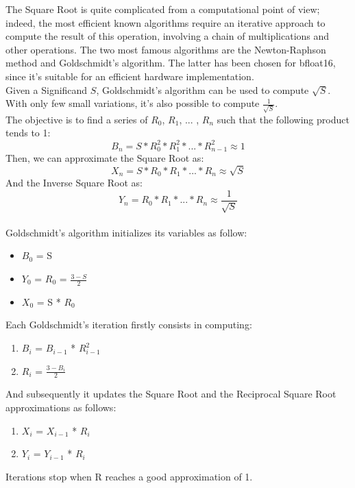 The Square Root is quite complicated from a computational point of view; indeed, the most efficient known algorithms require an iterative approach to compute the result of this operation, involving a chain of multiplications and other operations. The two most famous algorithms are the Newton-Raphson method and Goldschmidt’s algorithm. The latter has been chosen for bfloat16, since it's suitable for an efficient hardware implementation. 
\\
Given a Significand $S$, Goldschmidt's algorithm can be used to compute $\sqrt{S}$. With only few small variations, it's also possible to compute $\frac{1}{\sqrt{S}}$.\\
The objective is to find a series of $R_0$, $R_1$, ... , $R_n$ such that the following product tends to 1:
$$B_n = S*R_0^{2}*R_1^{2}* ... * R_{n-1}^{2} \approx 1 $$
Then, we can approximate the Square Root as:
$$ X_{n} = S * R_0*R_1* ... * R_n \approx \sqrt{S} $$
And the Inverse Square Root as:
$$ Y_n =   R_0*R_1* ... * R_n \approx  \frac{1}{\sqrt{S}}$$
\\
Goldschmidt's algorithm initializes its variables as follow:

\begin{itemize}
\item $B_0$ = S
\item $Y_0$ = $R_0$ = $\frac{3-S}{2}$
\item $X_0$ = S * $R_0$
\end{itemize}

\noindent Each Goldschmidt's iteration firstly consists in computing:

\begin{enumerate}
\item $B_i$ = $B_{i-1}$ * $R_{i-1}^{2}$
\item $R_i$ = $\frac{3-B_i}{2}$
\end{enumerate}

\noindent And subsequently it updates the Square Root and the Reciprocal Square Root approximations as follows:
\begin{enumerate}
\item $X_i$ = $X_{i-1}$ * $R_i$
\item $Y_i$ = $Y_{i-1}$ * $R_i$
\end{enumerate}

\noindent Iterations stop when R reaches a good approximation of 1.\\

